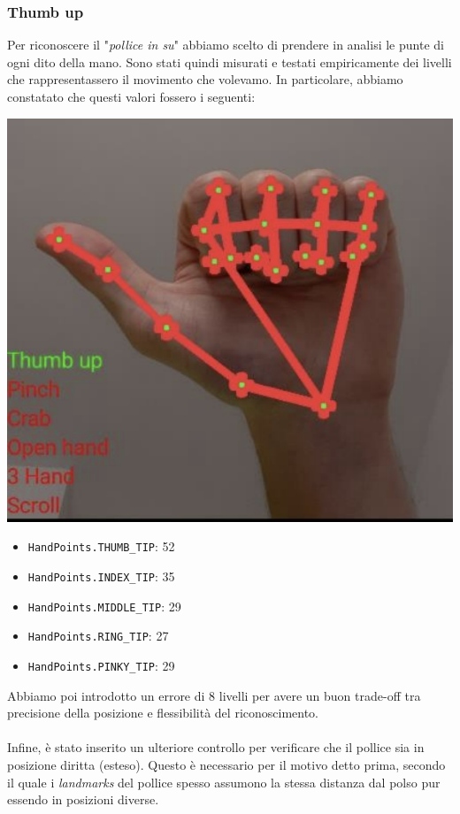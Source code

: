 \subsubsection{Thumb up}
Per riconoscere il "\textit{pollice in su}" abbiamo scelto di prendere in analisi le punte di ogni dito della mano. Sono stati quindi misurati e testati empiricamente dei livelli che rappresentassero il movimento che volevamo. 
In particolare, abbiamo constatato che questi valori fossero i seguenti:
\begin{multicols}{2}
    \begin{multicolfigure}
        \centering
        \includegraphics[width=\textwidth]{images/thumb_up.png}
    \end{multicolfigure}
    \columnbreak
    \begin{itemize}
        \item \texttt{HandPoints.THUMB\_TIP}: 52
        \item \texttt{HandPoints.INDEX\_TIP}: 35
        \item \texttt{HandPoints.MIDDLE\_TIP}: 29
        \item \texttt{HandPoints.RING\_TIP}: 27
        \item \texttt{HandPoints.PINKY\_TIP}: 29
    \end{itemize} 
\end{multicols}

\noindent Abbiamo poi introdotto un errore di 8 livelli per avere un buon trade-off tra precisione della posizione e flessibilità del riconoscimento.\\
\\
\noindent Infine, è stato inserito un ulteriore controllo per verificare che il pollice sia in posizione diritta (esteso). Questo è necessario per il motivo detto prima, secondo il quale i \textit{landmarks} del pollice spesso assumono la stessa distanza dal polso pur essendo in posizioni diverse.

